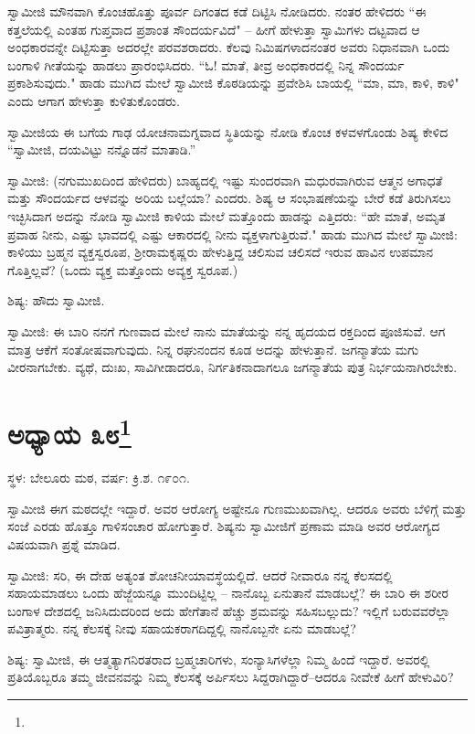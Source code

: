ಸ್ವಾಮೀಜಿ ಮೌನವಾಗಿ ಕೊಂಚಹೊತ್ತು ಪೂರ್ವ ದಿಗಂತದ ಕಡೆ ದಿಟ್ಟಿಸಿ ನೋಡಿದರು. ನಂತರ ಹೇಳಿದರು “ಈ ಕತ್ತಲೆಯಲ್ಲಿ ಎಂತಹ ಗುಪ್ತವಾದ ಪ್ರಶಾಂತ ಸೌಂದರ್ಯವಿದೆ" – ಹೀಗೆ ಹೇಳುತ್ತಾ ಸ್ವಾಮಿಗಳು ದಟ್ಟವಾದ ಆ ಅಂಧಕಾರವನ್ನೇ ದಿಟ್ಟಿಸುತ್ತಾ ಅದರಲ್ಲೇ ಪರವಶರಾದರು. ಕೆಲವು ನಿಮಿಷಗಳಾದನಂತರ ಅವರು ನಿಧಾನವಾಗಿ ಒಂದು ಬಂಗಾಳಿ ಗೀತೆಯನ್ನು ಹಾಡಲು ಪ್ರಾರಂಭಿಸಿದರು. “ಓ! ಮಾತೆ, ತೀವ್ರ ಅಂಧಕಾರದಲ್ಲಿ ನಿನ್ನ ಸೌಂದರ್ಯ ಪ್ರಕಾಶಿಸುವುದು." ಹಾಡು ಮುಗಿದ ಮೇಲೆ ಸ್ವಾಮೀಜಿ ಕೊಠಡಿಯನ್ನು ಪ್ರವೇಶಿಸಿ ಬಾಯಲ್ಲಿ “ಮಾ, ಮಾ, ಕಾಳಿ, ಕಾಳಿ" ಎಂದು ಆಗಾಗ ಹೇಳುತ್ತಾ ಕುಳಿತುಕೊಂಡರು.

ಸ್ವಾಮೀಜಿಯ ಈ ಬಗೆಯ ಗಾಢ ಯೋಚನಾಮಗ್ನವಾದ ಸ್ಥಿತಿಯನ್ನು ನೋಡಿ ಕೊಂಚ ಕಳವಳಗೊಂಡು ಶಿಷ್ಯ ಕೇಳಿದ “ಸ್ವಾಮೀಜಿ, ದಯವಿಟ್ಟು ನನ್ನೊಡನೆ ಮಾತಾಡಿ.”

ಸ್ವಾಮೀಜಿ: (ನಗುಮುಖದಿಂದ ಹೇಳಿದರು) ಬಾಹ್ಯದಲ್ಲಿ ಇಷ್ಟು ಸುಂದರವಾಗಿ ಮಧುರವಾಗಿರುವ ಆತ್ಮನ ಅಗಾಧತೆ ಮತ್ತು ಸೌಂದರ್ಯದ ಆಳವನ್ನು ಅರಿಯ ಬಲ್ಲೆಯಾ? ಎಂದರು. ಶಿಷ್ಯ ಆ ಸಂಭಾಷಣೆಯನ್ನು ಬೇರೆ ಕಡೆ ತಿರುಗಿಸಲು ಇಚ್ಛಿಸಿದಾಗ ಅದನ್ನು ನೋಡಿ ಸ್ವಾಮೀಜಿ ಕಾಳಿಯ ಮೇಲೆ ಮತ್ತೊಂದು ಹಾಡನ್ನು ಎತ್ತಿದರು: “ಹೇ ಮಾತೆ, ಅಮೃತ ಪ್ರವಾಹ ನೀನು, ಎಷ್ಟು ಭಾವದಲ್ಲಿ ಎಷ್ಟು ಆಕಾರದಲ್ಲಿ ನೀನು ವ್ಯಕ್ತಳಾಗುತ್ತಿರುವೆ." ಹಾಡು ಮುಗಿದ ಮೇಲೆ ಸ್ವಾಮೀಜಿ: ಕಾಳಿಯು ಬ್ರಹ್ಮನ ವ್ಯಕ್ತಸ್ವರೂಪ, ಶ‍್ರೀರಾಮಕೃಷ್ಣರು ಹೇಳುತ್ತಿದ್ದ ಚಲಿಸುವ ಚಲಿಸದೆ ಇರುವ ಹಾವಿನ ಉಪಮಾನ ಗೊತ್ತಿಲ್ಲವೆ? (ಒಂದು ವ್ಯಕ್ತ ಮತ್ತೊಂದು ಅವ್ಯಕ್ತ ಸ್ವರೂಪ.)

ಶಿಷ್ಯ: ಹೌದು ಸ್ವಾಮೀಜಿ.

ಸ್ವಾಮೀಜಿ: ಈ ಬಾರಿ ನನಗೆ ಗುಣವಾದ ಮೇಲೆ ನಾನು ಮಾತೆಯನ್ನು ನನ್ನ ಹೃದಯದ ರಕ್ತದಿಂದ ಪೂಜಿಸುವೆ. ಆಗ ಮಾತ್ರ ಆಕೆಗೆ ಸಂತೋಷವಾಗುವುದು. ನಿನ್ನ ರಘುನಂದನ ಕೂಡ ಅದನ್ನು ಹೇಳುತ್ತಾನೆ. ಜಗನ್ಮಾತೆಯ ಮಗು ವೀರನಾಗಬೇಕು. ವ್ಯಥೆ, ದುಃಖ, ಸಾವಿಗೀಡಾದರೂ, ನಿರ್ಗತಿಕನಾದಾಗಲೂ ಜಗನ್ಮಾತೆಯ ಪುತ್ರ ನಿರ್ಭಯನಾಗಿರಬೇಕು.

\newpage

\chapter[ಅಧ್ಯಾಯ ೩೮]{ಅಧ್ಯಾಯ ೩೮\protect\footnote{}}

\centerline{ಸ್ಥಳ: ಬೇಲೂರು ಮಠ, ವರ್ಷ: ಕ್ರಿ.ಶ. ೧೯೦೧.}

ಸ್ವಾಮೀಜಿ ಈಗ ಮಠದಲ್ಲೇ ಇದ್ದಾರೆ. ಅವರ ಆರೋಗ್ಯ ಅಷ್ಟೇನೂ ಗುಣಮುಖವಾಗಿಲ್ಲ. ಆದರೂ ಅವರು ಬೆಳಿಗ್ಗೆ ಮತ್ತು ಸಂಜೆ ಎರಡು ಹೊತ್ತೂ ಗಾಳಿಸಂಚಾರ ಹೋಗುತ್ತಾರೆ. ಶಿಷ್ಯನು ಸ್ವಾಮೀಜಿಗೆ ಪ್ರಣಾಮ ಮಾಡಿ ಅವರ ಆರೋಗ್ಯದ ವಿಷಯವಾಗಿ ಪ್ರಶ್ನೆ ಮಾಡಿದ.

ಸ್ವಾಮೀಜಿ: ಸರಿ, ಈ ದೇಹ ಅತ್ಯಂತ ಶೋಚನೀಯಾವಸ್ಥೆಯಲ್ಲಿದೆ. ಆದರೆ ನೀವಾರೂ ನನ್ನ ಕೆಲಸದಲ್ಲಿ ಸಹಾಯಮಾಡಲು ಒಂದು ಹೆಜ್ಜೆಯನ್ನೂ ಮುಂದಿಟ್ಟಿಲ್ಲ – ನಾನೊಬ್ಬ ಏನುತಾನೆ ಮಾಡಬಲ್ಲೆ? ಈ ಬಾರಿ ಈ ಶರೀರ ಬಂಗಾಳ ದೇಶದಲ್ಲಿ ಜನಿಸಿದುದರಿಂದ ಅದು ಹೇಗೆತಾನೆ ಹೆಚ್ಚು ಶ್ರಮವನ್ನು ಸಹಿಸಬಲ್ಲುದು? ಇಲ್ಲಿಗೆ ಬರುವವರೆಲ್ಲಾ ಪವಿತ್ರಾತ್ಮರು. ನನ್ನ ಕೆಲಸಕ್ಕೆ ನೀವು ಸಹಾಯಕರಾಗದಿದ್ದಲ್ಲಿ ನಾನೊಬ್ಬನೇ ಏನು ಮಾಡಬಲ್ಲೆ?

ಶಿಷ್ಯ: ಸ್ವಾಮೀಜಿ, ಈ ಆತ್ಮತ್ಯಾಗನಿರತರಾದ ಬ್ರಹ್ಮಚಾರಿಗಳು, ಸಂನ್ಯಾಸಿಗಳೆಲ್ಲಾ ನಿಮ್ಮ ಹಿಂದೆ ಇದ್ದಾರೆ. ಅವರಲ್ಲಿ ಪ್ರತಿಯೊಬ್ಬರೂ ತಮ್ಮ ಜೀವನವನ್ನು ನಿಮ್ಮ ಕೆಲಸಕ್ಕೆ ಅರ್ಪಿಸಲು ಸಿದ್ದರಾಗಿದ್ದಾರೆ–ಆದರೂ ನೀವೇಕೆ ಹೀಗೆ ಹೇಳುವಿರಿ?

